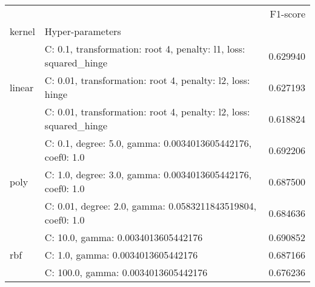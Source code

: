 \begin{tabular}{llr}
\toprule
 &  & F1-score \\
kernel & Hyper-parameters &  \\
\midrule
\multirow[t]{3}{*}{linear} & C: 0.1, transformation: root 4, penalty: l1, loss: squared_hinge & 0.629940 \\
 & C: 0.01, transformation: root 4, penalty: l2, loss: hinge & 0.627193 \\
 & C: 0.01, transformation: root 4, penalty: l2, loss: squared_hinge & 0.618824 \\
\cline{1-3}
\multirow[t]{3}{*}{poly} & C: 0.1, degree: 5.0, gamma: 0.0034013605442176, coef0: 1.0 & 0.692206 \\
 & C: 1.0, degree: 3.0, gamma: 0.0034013605442176, coef0: 1.0 & 0.687500 \\
 & C: 0.01, degree: 2.0, gamma: 0.0583211843519804, coef0: 1.0 & 0.684636 \\
\cline{1-3}
\multirow[t]{3}{*}{rbf} & C: 10.0, gamma: 0.0034013605442176 & 0.690852 \\
 & C: 1.0, gamma: 0.0034013605442176 & 0.687166 \\
 & C: 100.0, gamma: 0.0034013605442176 & 0.676236 \\
\cline{1-3}
\bottomrule
\end{tabular}
